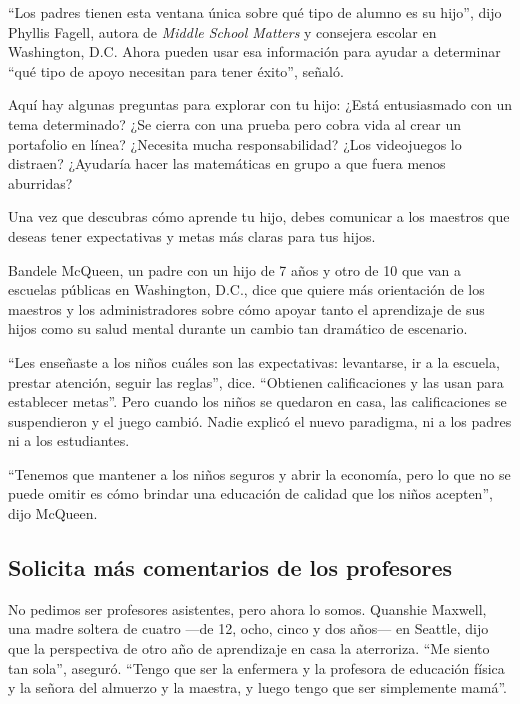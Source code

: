 ``Los padres tienen esta ventana única sobre qué tipo de alumno es su
hijo'', dijo Phyllis Fagell, autora de \emph{Middle School Matters} y
consejera escolar en Washington, D.C. Ahora pueden usar esa información
para ayudar a determinar ``qué tipo de apoyo necesitan para tener
éxito'', señaló.

Aquí hay algunas preguntas para explorar con tu hijo: ¿Está entusiasmado
con un tema determinado? ¿Se cierra con una prueba pero cobra vida al
crear un portafolio en línea? ¿Necesita mucha responsabilidad? ¿Los
videojuegos lo distraen? ¿Ayudaría hacer las matemáticas en grupo a que
fuera menos aburridas?

Una vez que descubras cómo aprende tu hijo, debes comunicar a los
maestros que deseas tener expectativas y metas más claras para tus
hijos.

Bandele McQueen, un padre con un hijo de 7 años y otro de 10 que van a
escuelas públicas en Washington, D.C., dice que quiere más orientación
de los maestros y los administradores sobre cómo apoyar tanto el
aprendizaje de sus hijos como su salud mental durante un cambio tan
dramático de escenario.

``Les enseñaste a los niños cuáles son las expectativas: levantarse, ir
a la escuela, prestar atención, seguir las reglas'', dice. ``Obtienen
calificaciones y las usan para establecer metas''. Pero cuando los niños
se quedaron en casa, las calificaciones se suspendieron y el juego
cambió. Nadie explicó el nuevo paradigma, ni a los padres ni a los
estudiantes.

``Tenemos que mantener a los niños seguros y abrir la economía, pero lo
que no se puede omitir es cómo brindar una educación de calidad que los
niños acepten'', dijo McQueen.

\hypertarget{solicita-muxe1s-comentarios-de-los-profesores}{%
\subsection{Solicita más comentarios de los
profesores}\label{solicita-muxe1s-comentarios-de-los-profesores}}

No pedimos ser profesores asistentes, pero ahora lo somos. Quanshie
Maxwell, una madre soltera de cuatro ---de 12, ocho, cinco y dos años---
en Seattle, dijo que la perspectiva de otro año de aprendizaje en casa
la aterroriza. ``Me siento tan sola'', aseguró. ``Tengo que ser la
enfermera y la profesora de educación física y la señora del almuerzo y
la maestra, y luego tengo que ser simplemente mamá''.

